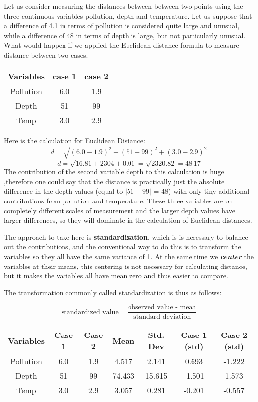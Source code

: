 \documentclass[SKLCluster.tex]{subfiles}
\begin{document}
Let us consider measuring the distances between between two points using
the three continuous variables pollution, depth and temperature. Let us suppose that a difference of 4.1 in terms of pollution is considered quite large and unusual, while a difference of 48 in terms of depth is large, but not particularly unusual.
What would happen if we applied the Euclidean distance formula to measure distance between two cases.
\begin{center}
\begin{tabular}{|c|c|c|}
  \hline
Variables & case 1 & case 2 \\ \hline 
Pollution & 6.0 & 1.9 \\
Depth & 51 & 99 \\
Temp & 3.0 & 2.9 \\
  \hline
\end{tabular}
\end{center}

Here is the calculation for Euclidean Distance:
\[ d = \sqrt{(6.0 - 1.9)^2 + (51 - 99)^2 + (3.0 - 2.9)^2}   \]
 \[ d = \sqrt{16.81 + 2304 + 0.01} = \sqrt{2320.82} = 48.17 \]
\noindent The contribution of the second variable depth to this calculation is huge ,therefore one could say
that the distance is practically just the absolute difference in the depth values (equal to
$|51-99|$ = 48) with only tiny additional contributions from pollution and temperature. These three variables are on
completely different scales of measurement and the larger depth values have larger differences, so they will dominate in the calculation of Euclidean distances.


\noindent The approach to take here is \textbf{standardization}, which is is necessary to balance out the contributions, and the
conventional way to do this is to transform the variables so they all have the same variance
of 1. At the same time we \textbf{\textit{center}} the variables at their means, this centering is not
necessary for calculating distance, but it makes the variables all have mean zero and thus
easier to compare. 

\noindent The transformation commonly called standardization is thus as follows:

\[\mbox{standardized value} = \frac{\mbox{observed value - mean}}{ \mbox{standard deviation}}\]
\begin{center}
\begin{tabular}{|c|c|c|c|c|c|c|}
  \hline
Variables & Case 1 & Case 2 & Mean & Std. Dev & Case 1 (std) & Case 2 (std) \\ \hline
Pollution & 6.0 & 1.9 & 4.517	&	2.141	&	0.693	&	-1.222	\\
Depth & 51 & 99 & 74.433	&	15.615	&	-1.501	&	1.573	\\
Temp & 3.0 & 2.9 & 3.057	&	0.281	&	-0.201	&	-0.557	\\
  \hline
\end{tabular}
\end{center}
\end{document}
